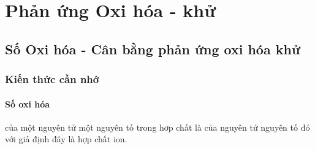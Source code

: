 \chapter{Phản ứng Oxi hóa - khử}
\section{Số Oxi hóa - Cân bằng phản ứng oxi hóa khử}
\subsection{Kiến thức cần nhớ}
\begin{body}
	\subsubsection{Số oxi hóa}
	\begin{dn}
		 của một nguyên tử một nguyên tố trong hơp chất là  của nguyên tử nguyên tố đó với giả định đây là hợp chất ion.
	\end{dn}

\end{body}
